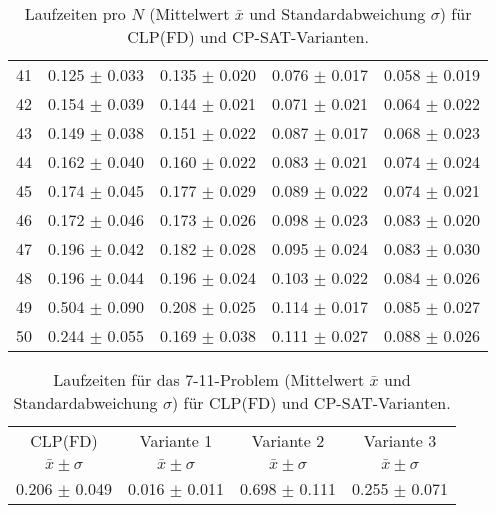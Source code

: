 \documentclass[12pt,a4paper]{article}
\begin{document}
\begin{table}[H]
\begin{tabular}{rcccc}
41 & 0.125 $\pm$ 0.033 & 0.135 $\pm$ 0.020 & 0.076 $\pm$ 0.017 & 0.058 $\pm$ 0.019 \\
42 & 0.154 $\pm$ 0.039 & 0.144 $\pm$ 0.021 & 0.071 $\pm$ 0.021 & 0.064 $\pm$ 0.022 \\
43 & 0.149 $\pm$ 0.038 & 0.151 $\pm$ 0.022 & 0.087 $\pm$ 0.017 & 0.068 $\pm$ 0.023 \\
44 & 0.162 $\pm$ 0.040 & 0.160 $\pm$ 0.022 & 0.083 $\pm$ 0.021 & 0.074 $\pm$ 0.024 \\
45 & 0.174 $\pm$ 0.045 & 0.177 $\pm$ 0.029 & 0.089 $\pm$ 0.022 & 0.074 $\pm$ 0.021 \\
46 & 0.172 $\pm$ 0.046 & 0.173 $\pm$ 0.026 & 0.098 $\pm$ 0.023 & 0.083 $\pm$ 0.020 \\
47 & 0.196 $\pm$ 0.042 & 0.182 $\pm$ 0.028 & 0.095 $\pm$ 0.024 & 0.083 $\pm$ 0.030 \\
48 & 0.196 $\pm$ 0.044 & 0.196 $\pm$ 0.024 & 0.103 $\pm$ 0.022 & 0.084 $\pm$ 0.026 \\
49 & 0.504 $\pm$ 0.090 & 0.208 $\pm$ 0.025 & 0.114 $\pm$ 0.017 & 0.085 $\pm$ 0.027 \\
50 & 0.244 $\pm$ 0.055 & 0.169 $\pm$ 0.038 & 0.111 $\pm$ 0.027 & 0.088 $\pm$ 0.026 \\
\bottomrule
\end{tabular}
\caption{Laufzeiten pro $N$ (Mittelwert $\bar{x}$ und Standardabweichung $\sigma$) für CLP(FD) und CP-SAT-Varianten.}
\label{tab:benchmark-nqueens}
\end{table}

\begin{table}[H]
\centering
\small
\setlength{\tabcolsep}{6pt}
\begin{tabular}{cccc}
\toprule
CLP(FD) & Variante 1 & Variante 2 & Variante 3 \\
$\bar{x} \pm \sigma$ & $\bar{x} \pm \sigma$ & $\bar{x} \pm \sigma$ & $\bar{x} \pm \sigma$ \\
\midrule
0.206 $\pm$ 0.049 & 0.016 $\pm$ 0.011 & 0.698 $\pm$ 0.111 & 0.255 $\pm$ 0.071 \\
\bottomrule
\end{tabular}
\caption{Laufzeiten für das 7-11-Problem (Mittelwert $\bar{x}$ und Standardabweichung $\sigma$) für CLP(FD) und CP-SAT-Varianten.}
\label{tab:benchmark-711}
\end{table}
\captionsetup[lstlisting]{justification=raggedright,singlelinecheck=false}
\end{document}
